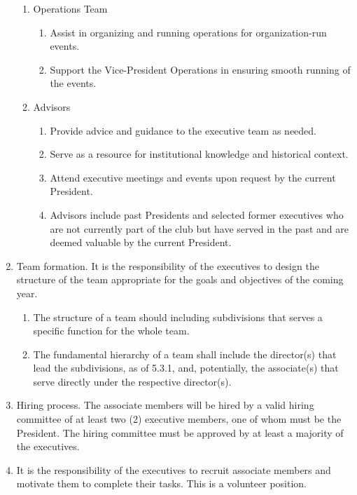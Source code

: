 \documentclass[12pt,a4paper]{article}
\begin{document}
\begin{enumerate}
\begin{enumerate}
\item Operations Team

\begin{enumerate}
\item Assist in organizing and running operations for organization-run events.

\item Support the Vice-President Operations in ensuring smooth running of the events.
\end{enumerate}

\item Advisors

\begin{enumerate}
\item Provide advice and guidance to the executive team as needed.

\item Serve as a resource for institutional knowledge and historical context.

\item Attend executive meetings and events upon request by the current President.

\item Advisors include past Presidents and selected former executives who are not currently part of the club but have served in the past and are deemed valuable by the current President.
\end{enumerate}
\end{enumerate}

\item Team formation. It is the responsibility of the executives to design the structure of the team appropriate for the goals and objectives of the coming year.

\begin{enumerate}
\item The structure of a team should including subdivisions that serves a specific function for the whole team.

\item The fundamental hierarchy of a team shall include the director(s) that lead the subdivisions, as of 5.3.1, and, potentially, the associate(s) that serve directly under the respective director(s).
\end{enumerate}

\item Hiring process. The associate members will be hired by a valid hiring committee of at least two (2) executive members, one of whom must be the President. The hiring committee must be approved by at least a majority of the executives.

\item It is the responsibility of the executives to recruit associate members and motivate them to complete their tasks. This is a volunteer position.
\end{enumerate}
\end{document}
